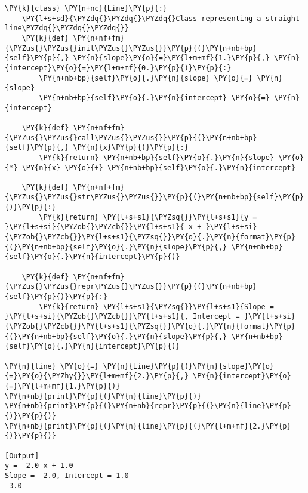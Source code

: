 \begin{Verbatim}[label=\makebox{\url{https://github.com/lucabaldini/cmepda/tree/master/slides/latex/snippets/callable\_line.py}},commandchars=\\\{\}]
\PY{k}{class} \PY{n+nc}{Line}\PY{p}{:}
    \PY{l+s+sd}{\PYZdq{}\PYZdq{}\PYZdq{}Class representing a straight line\PYZdq{}\PYZdq{}\PYZdq{}}
    \PY{k}{def} \PY{n+nf+fm}{\PYZus{}\PYZus{}init\PYZus{}\PYZus{}}\PY{p}{(}\PY{n+nb+bp}{self}\PY{p}{,} \PY{n}{slope}\PY{o}{=}\PY{l+m+mf}{1.}\PY{p}{,} \PY{n}{intercept}\PY{o}{=}\PY{l+m+mf}{0.}\PY{p}{)}\PY{p}{:}
        \PY{n+nb+bp}{self}\PY{o}{.}\PY{n}{slope} \PY{o}{=} \PY{n}{slope}
        \PY{n+nb+bp}{self}\PY{o}{.}\PY{n}{intercept} \PY{o}{=} \PY{n}{intercept}
    
    \PY{k}{def} \PY{n+nf+fm}{\PYZus{}\PYZus{}call\PYZus{}\PYZus{}}\PY{p}{(}\PY{n+nb+bp}{self}\PY{p}{,} \PY{n}{x}\PY{p}{)}\PY{p}{:}
        \PY{k}{return} \PY{n+nb+bp}{self}\PY{o}{.}\PY{n}{slope} \PY{o}{*} \PY{n}{x} \PY{o}{+} \PY{n+nb+bp}{self}\PY{o}{.}\PY{n}{intercept}
        
    \PY{k}{def} \PY{n+nf+fm}{\PYZus{}\PYZus{}str\PYZus{}\PYZus{}}\PY{p}{(}\PY{n+nb+bp}{self}\PY{p}{)}\PY{p}{:}
        \PY{k}{return} \PY{l+s+s1}{\PYZsq{}}\PY{l+s+s1}{y = }\PY{l+s+si}{\PYZob{}\PYZcb{}}\PY{l+s+s1}{ x + }\PY{l+s+si}{\PYZob{}\PYZcb{}}\PY{l+s+s1}{\PYZsq{}}\PY{o}{.}\PY{n}{format}\PY{p}{(}\PY{n+nb+bp}{self}\PY{o}{.}\PY{n}{slope}\PY{p}{,} \PY{n+nb+bp}{self}\PY{o}{.}\PY{n}{intercept}\PY{p}{)}
    
    \PY{k}{def} \PY{n+nf+fm}{\PYZus{}\PYZus{}repr\PYZus{}\PYZus{}}\PY{p}{(}\PY{n+nb+bp}{self}\PY{p}{)}\PY{p}{:}
        \PY{k}{return} \PY{l+s+s1}{\PYZsq{}}\PY{l+s+s1}{Slope = }\PY{l+s+si}{\PYZob{}\PYZcb{}}\PY{l+s+s1}{, Intercept = }\PY{l+s+si}{\PYZob{}\PYZcb{}}\PY{l+s+s1}{\PYZsq{}}\PY{o}{.}\PY{n}{format}\PY{p}{(}\PY{n+nb+bp}{self}\PY{o}{.}\PY{n}{slope}\PY{p}{,} \PY{n+nb+bp}{self}\PY{o}{.}\PY{n}{intercept}\PY{p}{)}

\PY{n}{line} \PY{o}{=} \PY{n}{Line}\PY{p}{(}\PY{n}{slope}\PY{o}{=}\PY{o}{\PYZhy{}}\PY{l+m+mf}{2.}\PY{p}{,} \PY{n}{intercept}\PY{o}{=}\PY{l+m+mf}{1.}\PY{p}{)}
\PY{n+nb}{print}\PY{p}{(}\PY{n}{line}\PY{p}{)}
\PY{n+nb}{print}\PY{p}{(}\PY{n+nb}{repr}\PY{p}{(}\PY{n}{line}\PY{p}{)}\PY{p}{)}
\PY{n+nb}{print}\PY{p}{(}\PY{n}{line}\PY{p}{(}\PY{l+m+mf}{2.}\PY{p}{)}\PY{p}{)}

[Output]
y = -2.0 x + 1.0
Slope = -2.0, Intercept = 1.0
-3.0
\end{Verbatim}